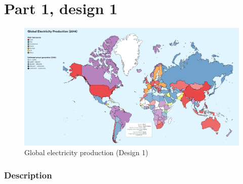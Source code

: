 \hypertarget{part-1-design-1}{
\section{Part 1, design 1}\label{part-1-design-1}}

\begin{figure}[ht]
  \centering
  \includegraphics[width=\textwidth]{../img/design1}
  \caption{Global electricity production (Design 1)}
\end{figure}

\hypertarget{description}{
\subsubsection{Description}\label{description}}

